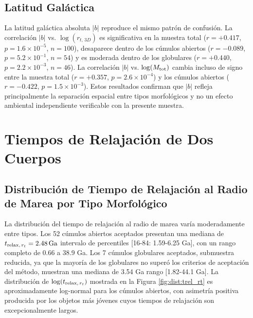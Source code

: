         \subsection{Latitud Galáctica}
            La latitud galáctica absoluta $|b|$ reproduce el mismo patrón de 
            confusión. La correlación $|b|$ vs. $\log(r_{t,\, 3{D}})$ es 
            significativa en la muestra total ($r = +0.417$, 
            $p = 1.6 \times 10^{-5}$, $n = 100$), desaparece dentro de los 
            cúmulos abiertos ($r = -0.089$, $p = 5.2 \times 10^{-1}$, $n = 54$) 
            y es moderada dentro de los globulares ($r = +0.440$, 
            $p = 2.2 \times 10^{-3}$, $n = 46$). La correlación $|b|$ vs. 
            $\log(M_{\rm tot})$ cambia incluso de signo entre la muestra total 
            ($r = +0.357$, $p = 2.6 \times 10^{-4}$) y los cúmulos abiertos 
            ($r = -0.422$, $p = 1.5 \times 10^{-3}$). Estos resultados confirman 
            que $|b|$ refleja  principalmente la separación espacial entre tipos 
            morfológicos y no un efecto ambiental independiente verificable con 
            la presente muestra.

    \section{Tiempos de Relajación de Dos Cuerpos} \label{sec:t_relax}
        
        \subsection{
            Distribución de Tiempo de Relajación al Radio de Marea por Tipo 
            Morfológico
            }
            La distribución del tiempo de relajación al radio de marea varía 
            moderadamente entre tipos. Los 52 cúmulos abiertos aceptados 
            presentan una mediana de $t_{{\rm relax},\, r_t } = 2.48\, {\rm Ga}$ 
            intervalo de percentiles [16-84: 1.59-6.25 Ga], con un rango 
            completo de 0.66 a 38.9 Ga. Los 7 cúmulos globulares aceptados, 
            submuestra reducida, ya que la mayoría de los globulares no superó 
            los criterios de aceptación del método, muestran una mediana de 
            3.54 Ga rango [1.82-44.1 Ga]. La distribución de 
            $\log(t_{{\rm relax},\, r_t})$ mostrada en la Figura 
            \ref{fig:dist:trel_rt} es aproximadamente log-normal para los 
            cúmulos abiertos, con asimetría positiva producida por los objetos 
            más jóvenes cuyos tiempos de relajación son excepcionalmente largos.

